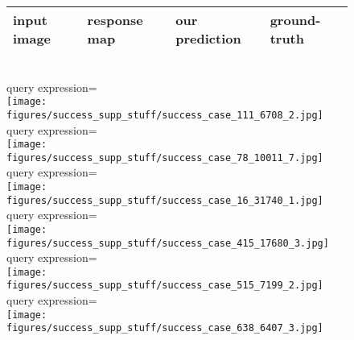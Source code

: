 \documentclass[runningheads]{llncs}
\begin{document}
\begin{figure}[t]
\centering
\begin{tabularx}{0.95\linewidth}{YYYY}
input image & response map & our prediction & ground-truth \\ \hline
\end{tabularx} \\
\small{query expression=} \\
\texttt{[image: figures/success\_supp\_stuff/success\_case\_111\_6708\_2.jpg]} \\
\small{query expression=} \\
\texttt{[image: figures/success\_supp\_stuff/success\_case\_78\_10011\_7.jpg]} \\
\small{query expression=} \\
\texttt{[image: figures/success\_supp\_stuff/success\_case\_16\_31740\_1.jpg]} \\
\small{query expression=} \\
\texttt{[image: figures/success\_supp\_stuff/success\_case\_415\_17680\_3.jpg]} \\
\small{query expression=} \\
\texttt{[image: figures/success\_supp\_stuff/success\_case\_515\_7199\_2.jpg]} \\
\small{query expression=} \\
\texttt{[image: figures/success\_supp\_stuff/success\_case\_638\_6407\_3.jpg]} \\
\end{figure}
\end{document}
